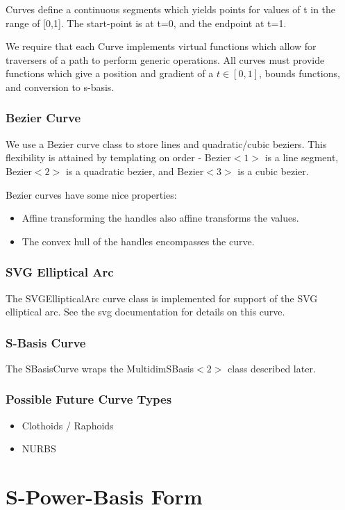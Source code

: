\documentclass{book}
\newcommand{\code}[1]{\textsf{#1}}
\begin{document}
Curves define a continuous segments which yields points for values of
t in the range of [0,1].  The start-point is at t=0, and the endpoint
at t=1.

We require that each \code{Curve} implements virtual functions which
allow for traversers of a path to perform generic operations.  All
curves must provide functions which give a position and gradient of a
$t \in [0,1]$, bounds functions, and conversion to s-basis.

\subsection{Bezier Curve}
We use a \code{Bezier} curve class to store lines and quadratic/cubic
beziers.  This flexibility is attained by templating on order -
\code{Bezier$<1>$} is a line segment, \code{Bezier$<2>$} is a quadratic
bezier, and \code{Bezier$<3>$} is a cubic bezier.

Bezier curves have some nice properties:
\begin{itemize}
\item Affine transforming the handles also affine transforms the values.
\item The convex hull of the handles encompasses the curve.
\end{itemize}

\subsection{SVG Elliptical Arc}
The \code{SVGEllipticalArc} curve class is implemented for support of
the SVG elliptical arc.  See the svg documentation for details on this
curve.

\subsection{S-Basis Curve}
The \code{SBasisCurve} wraps the \code{MultidimSBasis$<2>$} class
described later.

\subsection{Possible Future Curve Types}
\begin{itemize}
\item Clothoids / Raphoids
\item NURBS
\end{itemize}

\chapter{S-Power-Basis Form}
\end{document}
